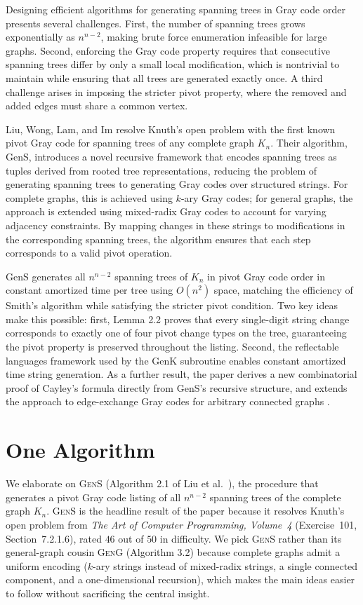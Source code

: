 \documentclass{article}
\begin{document}
Designing efficient algorithms for generating spanning trees in Gray code order presents
several challenges. First, the number of spanning trees grows exponentially as $n^{n-2}$,
making brute force enumeration infeasible for large graphs. Second, enforcing the Gray
code property requires that consecutive spanning trees differ by only a small local
modification, which is nontrivial to maintain while ensuring that all trees are generated
exactly once. A third challenge arises in imposing the stricter pivot property, where
the removed and added edges must share a common vertex.

Liu, Wong, Lam, and Im \cite{liu2026} resolve Knuth's open problem with the first known
pivot Gray code for spanning trees of any complete graph $K_n$. Their algorithm, GenS,
introduces a novel recursive framework that encodes spanning trees as tuples derived from
rooted tree representations, reducing the problem of generating spanning trees to
generating Gray codes over structured strings. For complete graphs, this is achieved
using $k$-ary Gray codes; for general graphs, the approach is extended using mixed-radix
Gray codes to account for varying adjacency constraints. By mapping changes in these
strings to modifications in the corresponding spanning trees, the algorithm ensures that
each step corresponds to a valid pivot operation.

GenS generates all $n^{n-2}$ spanning trees of $K_n$ in pivot Gray code order in
constant amortized time per tree using $O(n^2)$ space, matching the efficiency of
Smith's algorithm while satisfying the stricter pivot condition. Two key ideas make this
possible: first, Lemma 2.2 proves that every single-digit string change corresponds to
exactly one of four pivot change types on the tree, guaranteeing the pivot property is
preserved throughout the listing. Second, the reflectable languages framework used by
the GenK subroutine enables constant amortized time string generation. As a further
result, the paper derives a new combinatorial proof of Cayley's formula directly from
GenS's recursive structure, and extends the approach to edge-exchange Gray codes for
arbitrary connected graphs \cite{liu2026}.

\section{One Algorithm}
\label{others}

We elaborate on \textsc{GenS} (Algorithm 2.1 of Liu et al.~\cite{liu2026}), the procedure that generates a pivot Gray code listing of all $n^{n-2}$ spanning trees of the complete graph $K_n$. \textsc{GenS} is the headline result of the paper because it resolves Knuth's open problem from \textit{The Art of Computer Programming, Volume~4} (Exercise~101, Section~7.2.1.6), rated $46$ out of $50$ in difficulty. We pick \textsc{GenS} rather than its general-graph cousin \textsc{GenG} (Algorithm 3.2) because complete graphs admit a uniform encoding ($k$-ary strings instead of mixed-radix strings, a single connected component, and a one-dimensional recursion), which makes the main ideas easier to follow without sacrificing the central insight.
\end{document}
